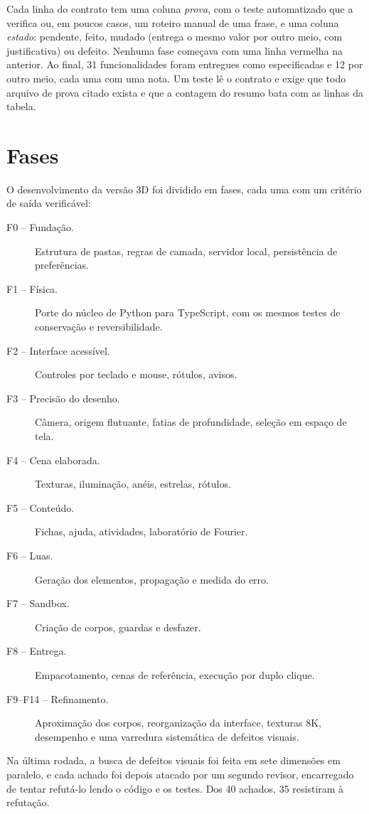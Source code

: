 Cada linha do contrato tem uma coluna \emph{prova}, com o teste automatizado que a verifica ou, em poucos casos, um roteiro manual de uma frase, e uma coluna \emph{estado}: pendente, feito, mudado (entrega o mesmo valor por outro meio, com justificativa) ou defeito. Nenhuma fase começava com uma linha vermelha na anterior. Ao final, 31 funcionalidades foram entregues como especificadas e 12 por outro meio, cada uma com uma nota. Um teste lê o contrato e exige que todo arquivo de prova citado exista e que a contagem do resumo bata com as linhas da tabela.

\section{Fases}

O desenvolvimento da versão 3D foi dividido em fases, cada uma com um critério de saída verificável:

\begin{description}
  \item[F0 -- Fundação.] Estrutura de pastas, regras de camada, servidor local, persistência de preferências.
  \item[F1 -- Física.] Porte do núcleo de Python para TypeScript, com os mesmos testes de conservação e reversibilidade.
  \item[F2 -- Interface acessível.] Controles por teclado e mouse, rótulos, avisos.
  \item[F3 -- Precisão do desenho.] Câmera, origem flutuante, fatias de profundidade, seleção em espaço de tela.
  \item[F4 -- Cena elaborada.] Texturas, iluminação, anéis, estrelas, rótulos.
  \item[F5 -- Conteúdo.] Fichas, ajuda, atividades, laboratório de Fourier.
  \item[F6 -- Luas.] Geração dos elementos, propagação e medida do erro.
  \item[F7 -- Sandbox.] Criação de corpos, guardas e desfazer.
  \item[F8 -- Entrega.] Empacotamento, cenas de referência, execução por duplo clique.
  \item[F9--F14 -- Refinamento.] Aproximação dos corpos, reorganização da interface, texturas 8K, desempenho e uma varredura sistemática de defeitos visuais.
\end{description}

Na última rodada, a busca de defeitos visuais foi feita em sete dimensões em paralelo, e cada achado foi depois atacado por um segundo revisor, encarregado de tentar refutá-lo lendo o código e os testes. Dos 40 achados, 35 resistiram à refutação.

